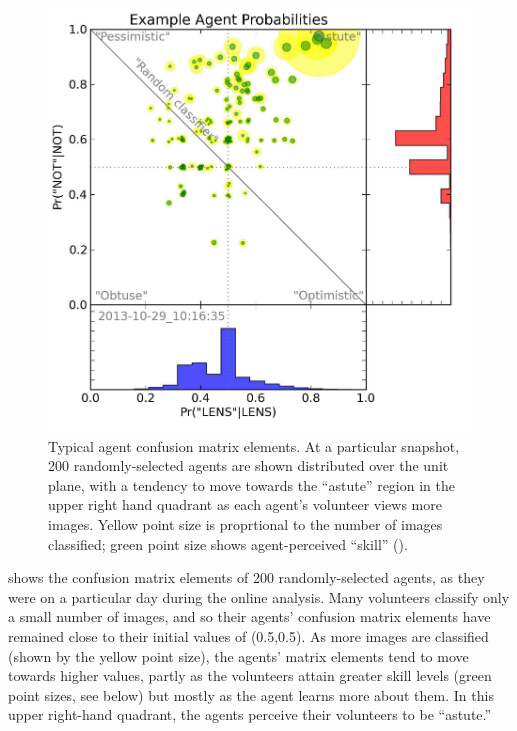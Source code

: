 \documentclass[useAMS,usenatbib,a4paper]{mn2e}
\begin{document}
\begin{figure}
\centering\includegraphics[width=0.9\linewidth]{CFHTLS_2013-10-29_101635_probabilities.pdf}
\caption{Typical \SW agent confusion matrix elements. At a particular
snapshot, 200 randomly-selected agents are shown distributed over the unit plane, with a
tendency to move towards the ``astute'' region in the upper right hand
quadrant as each agent's volunteer views more images. Yellow point size is
proprtional to the number of images classified; green point size shows
agent-perceived ``skill'' ().}
\label{fig:swap:agent-probabilities}
\end{figure}

 shows the confusion matrix elements of 200
randomly-selected agents, as they were on a particular day during the
\StageOne online analysis. Many volunteers classify  only a small number of images, and
so their agents' confusion matrix elements have remained close to their initial values
of (0.5,0.5). As more images are classified (shown by the yellow point size),
the agents' matrix elements tend to move towards higher values, partly as the
volunteers attain greater skill levels (green point sizes, see
 below) but mostly as
the agent learns more about them. In this upper
right-hand quadrant, the agents perceive their volunteers to be ``astute.''
\end{document}

